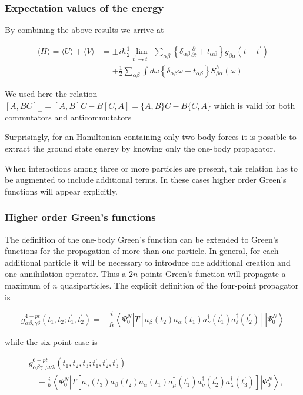 \documentclass[compress]{beamer}
\begin{document}
\frame
{
\frametitle{Expectation values of the energy}
\begin{small}
{\scriptsize
By combining the above results we arrive at

$$
\begin{aligned}
\langle H\rangle=\langle U\rangle+\langle V\rangle & = \pm i \hbar \frac{1}{2} \lim _{t^{\prime} \rightarrow t^{+}} \sum_{\alpha \beta}\left\{\delta_{\alpha \beta} \frac{\partial}{\partial t}+t_{\alpha \beta}\right\} g_{\beta \alpha}\left(t-t^{\prime}\right) \\
& =\mp \frac{1}{2} \sum_{\alpha \beta} \int d \omega\left\{\delta_{\alpha \beta} \omega+t_{\alpha \beta}\right\} S_{\beta \alpha}^{h}(\omega)
\end{aligned}
$$

We used here the relation $[A, B C]_{-}=[A, B] C-B[C, A]=\{A, B\}
C-B\{C, A\}$ which is valid for both commutators and anticommutators


Surprisingly, for an Hamiltonian containing only two-body forces it is
possible to extract the ground state energy by knowing only the
one-body propagator. 

When interactions among three or more particles are present, this
relation has to be augmented to include additional terms. In these
cases higher order Green's functions will appear explicitly.

}
\end{small}
}
\frame
{
\frametitle{Higher order  Green's functions}
\begin{small}
{\scriptsize

The definition of the one-body Green's function  can be extended to Green's functions for the
propagation of more than one particle. In general, for each additional
particle it will be necessary to introduce one additional creation and
one annihilation operator. Thus a $2 n$-points Green's function will
propagate a maximum of $n$ quasiparticles. The explicit definition of
the four-point propagator is

$$
g_{\alpha \beta, \gamma \delta}^{4-p t}\left(t_{1}, t_{2} ; t_{1}^{\prime}, t_{2}^{\prime}\right)=-\frac{i}{\hbar}\left\langle\Psi_{0}^{N}\left|T\left[a_{\beta}\left(t_{2}\right) a_{\alpha}\left(t_{1}\right) a_{\gamma}^{\dagger}\left(t_{1}^{\prime}\right) a_{\delta}^{\dagger}\left(t_{2}^{\prime}\right)\right]\right| \Psi_{0}^{N}\right\rangle
$$

while the six-point case is

$$
\begin{aligned}
& g_{\alpha \beta \gamma, \mu \nu \lambda}^{6-p t}\left(t_{1}, t_{2}, t_{3} ; t_{1}^{\prime}, t_{2}^{\prime}, t_{3}^{\prime}\right)= \\
& \quad-\frac{i}{\hbar}\left\langle\Psi_{0}^{N}\left|T\left[a_{\gamma}\left(t_{3}\right) a_{\beta}\left(t_{2}\right) a_{\alpha}\left(t_{1}\right) a_{\mu}^{\dagger}\left(t_{1}^{\prime}\right) a_{\nu}^{\dagger}\left(t_{2}^{\prime}\right) a_{\lambda}^{\dagger}\left(t_{3}^{\prime}\right)\right]\right| \Psi_{0}^{N}\right\rangle,
\end{aligned}
$$

}
\end{small}
}
\end{document}
